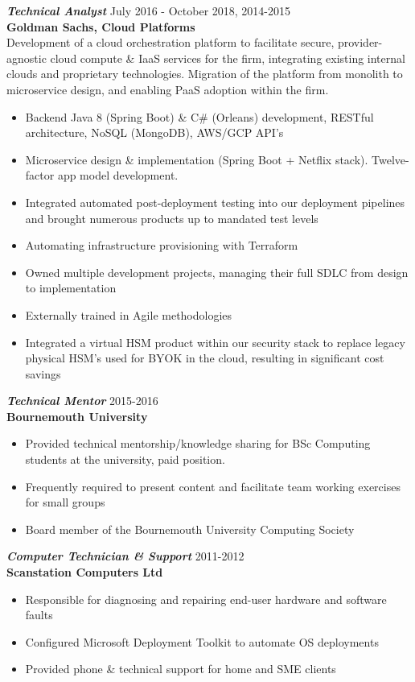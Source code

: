 \documentclass[margin, 10pt]{res} %
\begin{document}
\begin{resume}
    {\sl \textbf{Technical Analyst}} \hfill July 2016 - October 2018, 2014-2015 \\
    \textbf{Goldman Sachs, Cloud Platforms} \\
    Development of a cloud orchestration platform to facilitate secure, provider-agnostic cloud compute \& IaaS services for the firm, integrating existing internal clouds and proprietary technologies. Migration of the platform from monolith to microservice design, and enabling PaaS adoption within the firm.
    \begin{itemize}
    \item Backend Java 8 (Spring Boot) \& C\# (Orleans) development, \newline RESTful architecture, NoSQL (MongoDB), AWS/GCP API’s
    \item Microservice design \& implementation (Spring Boot + Netflix stack). Twelve-factor app model development.
    \item Integrated automated post-deployment testing into our  deployment pipelines and brought numerous products up to mandated test levels
    \item Automating infrastructure provisioning with Terraform
    \item Owned multiple development projects, managing their full SDLC from design to implementation
    \item Externally trained in Agile methodologies
    \item Integrated a virtual HSM product within our security stack to replace legacy physical HSM’s used for BYOK in the cloud, resulting in significant cost savings
    \end{itemize} 
    
    {\sl \textbf{Technical Mentor}} \hfill 2015-2016 \\
    \textbf{Bournemouth University}
    \begin{itemize}
    \item Provided technical mentorship/knowledge sharing for BSc Computing students at the university, paid position.
    \item Frequently required to present content and facilitate team working exercises for small groups
    \item Board member of the Bournemouth University Computing Society
    \end{itemize}
    
    
    \pagebreak %
    
    
    {\sl \textbf{Computer Technician \& Support}} \hfill 2011-2012 \\
    \textbf{Scanstation Computers Ltd}
    \begin{itemize}
    \item Responsible for diagnosing and repairing end-user hardware and software faults
    \item Configured Microsoft Deployment Toolkit to automate OS deployments
    \item Provided phone \& technical support for home and SME clients
    \end{itemize}
     

\end{resume}
\end{document}
